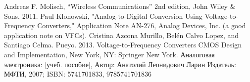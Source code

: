 \documentclass[a4paper,12pt,oneside]{scrartcl}
\begin{document}
%
%
%
%
%
%
%






\cleardoublepage
\begin{thebibliography}{99}
 Andreas F. Molisch, “Wireless Communications” 2nd edition, John Wiley \& Sons, 2011.
 Paul Klonowski, "Analog-to-Digital Conversion Using Voltage-to-Frequency Converters," Application Note AN-276, Analog Devices, Inc. (a good application note on VFCs).
 Cristina Azcona Murillo, Belén Calvo Lopez, and Santiago Celma. Pueyo. 2013. Voltage-to-Frequency Converters CMOS Design and Implementation, New York, NY: Springer New York.
Аналоговая электроника: [учеб. пособие], Автор:	Анатолий Леонидович Ларин
Издатель: МФТИ, 2007; ISBN:	5741701833, 9785741701836
\end{thebibliography}

\cleardoublepage
\end{document}
